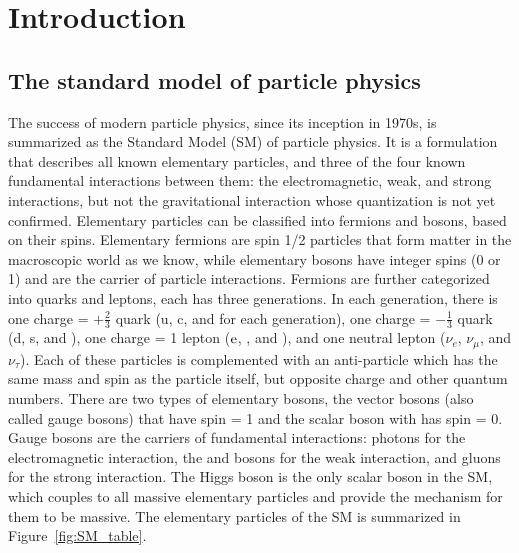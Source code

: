 \chapter{Introduction}

\section{The standard model of particle physics}

The success of modern particle physics, since its inception in 1970s, 
is summarized as the Standard Model (SM) of particle physics.
It is a formulation that describes all known elementary particles, 
and three of the four known fundamental interactions between them:
the electromagnetic, weak, and strong interactions, but not the gravitational interaction whose quantization is not yet confirmed.
Elementary particles can be classified into fermions and bosons, based on their spins.
Elementary fermions are spin 1/2 particles that form matter in the macroscopic world as we know,
while elementary bosons have integer spins (0 or 1) and are the carrier of particle interactions.
Fermions are further categorized into quarks and leptons, each has three generations.
In each generation, there is one charge = $+\frac{2}{3}$ quark (u, c, and \Pqt for each generation), 
one charge = $-\frac{1}{3}$ quark (d, s, and \Pqb), one charge = 1 lepton ($\mathrm{e}$, \mu, and \tau), 
and one neutral lepton ($\nu_{e}$, $\nu_{\mu}$, and $\nu_{\tau}$). 
Each of these particles is complemented with an anti-particle which has the same mass and spin as the particle itself, 
but opposite charge and other quantum numbers.
There are two types of elementary bosons, the vector bosons (also called gauge bosons) that have spin = 1 and the scalar boson with has spin = 0.
Gauge bosons are the carriers of fundamental interactions: photons for the electromagnetic interaction, the \PW and \PZ bosons for the weak interaction,
and gluons for the strong interaction.
The Higgs boson is the only scalar boson in the SM, 
which couples to all massive elementary particles and provide the mechanism for them to be massive.
The elementary particles of the SM is summarized in Figure~\ref{fig:SM_table}.

